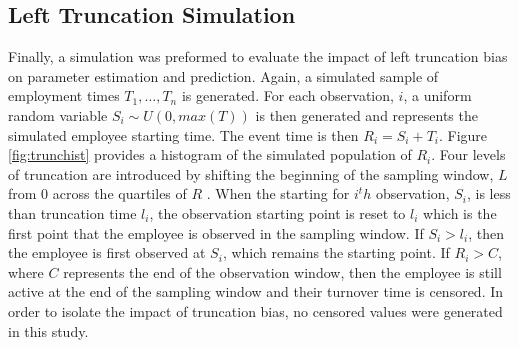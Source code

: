 \subsection{Left Truncation Simulation}

Finally, a simulation was preformed to evaluate the impact of left truncation bias on parameter estimation and prediction. Again, a simulated sample of employment times $T_1, \ldots, T_n$ is generated.  For each observation, $i$, a uniform random variable $S_i \sim U(0,max(T))$ is then generated and represents the simulated employee starting time. The event time is then $R_i = S_i+T_i$. Figure \ref{fig:trunchist} provides a histogram of the simulated population of $R_i$. Four levels of truncation are introduced by shifting the beginning of the sampling window, $L$ from 0 across the quartiles of $R$ . When the starting for $i^th$ observation, $S_i$, is less than truncation time $l_i$, the observation starting point is reset to $l_i$ which is the first point that the employee is observed in the sampling window. If $S_i> l_i$, then the employee is first observed at $S_i$, which remains the starting point.  If $R_i>C$, where $C$ represents the end of the observation window, then the employee is still active at the end of the sampling window and their turnover time is censored. In order to isolate the impact of truncation bias, no censored values were generated in this study.


